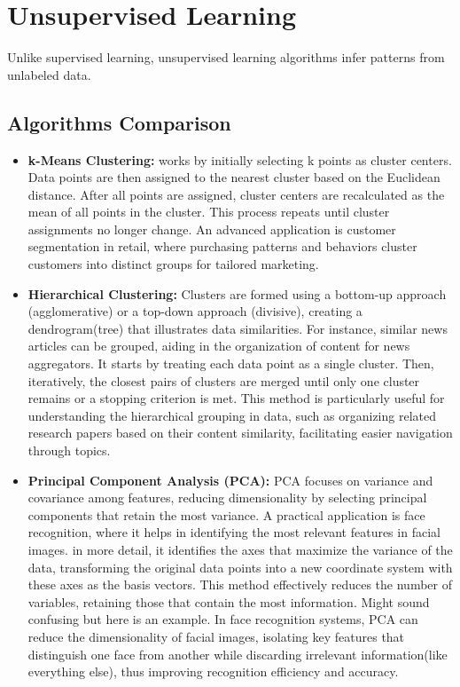 \documentclass[11pt, a4paper]{article}
\begin{document}
\section{Unsupervised Learning}
Unlike supervised learning, unsupervised learning algorithms infer patterns from unlabeled data.

\subsection{Algorithms Comparison}
\begin{itemize}
    \item \textbf{k-Means Clustering:} works by initially selecting k points as cluster centers. Data points are then assigned to the nearest cluster based on the Euclidean distance. After all points are assigned, cluster centers are recalculated as the mean of all points in the cluster. This process repeats until cluster assignments no longer change. An advanced application is customer segmentation in retail, where purchasing patterns and behaviors cluster customers into distinct groups for tailored marketing.


\item \textbf{Hierarchical Clustering:} Clusters are formed using a bottom-up approach (agglomerative) or a top-down approach (divisive), creating a dendrogram(tree) that illustrates data similarities. For instance, similar news articles can be grouped, aiding in the organization of content for news aggregators. It starts by treating each data point as a single cluster. Then, iteratively, the closest pairs of clusters are merged until only one cluster remains or a stopping criterion is met. This method is particularly useful for understanding the hierarchical grouping in data, such as organizing related research papers based on their content similarity, facilitating easier navigation through topics.

\item \textbf{Principal Component Analysis (PCA):} PCA focuses on variance and covariance among features, reducing dimensionality by selecting principal components that retain the most variance. A practical application is face recognition, where it helps in identifying the most relevant features in facial images. in more detail, it identifies the axes that maximize the variance of the data, transforming the original data points into a new coordinate system with these axes as the basis vectors. This method effectively reduces the number of variables, retaining those that contain the most information. Might sound confusing but here is an example. In face recognition systems, PCA can reduce the dimensionality of facial images, isolating key features that distinguish one face from another while discarding irrelevant information(like everything else), thus improving recognition efficiency and accuracy.

\end{itemize}
\end{document}
